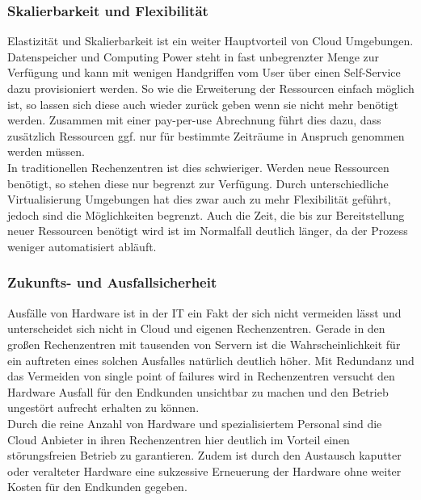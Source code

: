 \subsubsection{Skalierbarkeit und Flexibilität}\label{skalierbarkeit}
Elastizität und Skalierbarkeit ist ein weiter Hauptvorteil von Cloud Umgebungen. Datenspeicher und Computing Power steht in fast unbegrenzter Menge zur Verfügung und kann mit wenigen Handgriffen vom User über einen Self-Service dazu provisioniert werden. So wie die Erweiterung der Ressourcen einfach möglich ist, so lassen sich diese auch wieder zurück geben wenn sie nicht mehr benötigt werden. Zusammen mit einer pay-per-use Abrechnung führt dies dazu, dass zusätzlich Ressourcen ggf. nur für bestimmte Zeiträume in Anspruch genommen werden müssen. \\
In traditionellen Rechenzentren ist dies schwieriger. Werden neue Ressourcen benötigt, so stehen diese nur begrenzt zur Verfügung. Durch unterschiedliche Virtualisierung Umgebungen hat dies zwar auch zu mehr Flexibilität geführt, jedoch sind die Möglichkeiten begrenzt. Auch die Zeit, die bis zur Bereitstellung neuer Ressourcen benötigt wird ist im Normalfall deutlich länger, da der Prozess weniger automatisiert abläuft.

\subsubsection{Zukunfts- und Ausfallsicherheit}\label{zukunftssicherheit}
Ausfälle von Hardware ist in der IT ein Fakt der sich nicht vermeiden lässt und unterscheidet sich nicht in Cloud und eigenen Rechenzentren. Gerade in den großen Rechenzentren mit tausenden von Servern ist die Wahrscheinlichkeit für ein auftreten eines solchen Ausfalles natürlich deutlich höher. Mit Redundanz und das Vermeiden von single point of failures wird in Rechenzentren versucht den Hardware Ausfall für den Endkunden unsichtbar zu machen und den Betrieb ungestört aufrecht erhalten zu können. \\
Durch die reine Anzahl von Hardware und spezialisiertem Personal sind die Cloud Anbieter in ihren Rechenzentren hier deutlich im Vorteil einen störungsfreien Betrieb zu garantieren. Zudem ist durch den Austausch kaputter oder veralteter Hardware eine sukzessive Erneuerung der Hardware ohne weiter Kosten für den Endkunden gegeben.

